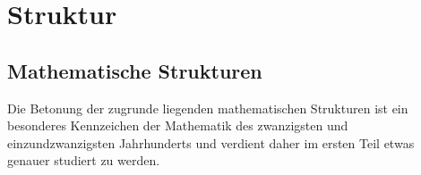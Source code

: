 %
%
%
\part{Struktur}

\chapter*{Mathematische Strukturen}


Die Betonung der zugrunde liegenden mathematischen Strukturen ist
ein besonderes Kennzeichen der Mathematik des zwanzigsten und 
einzundzwanzigsten Jahrhunderts und verdient daher im ersten Teil
etwas genauer studiert zu werden.

